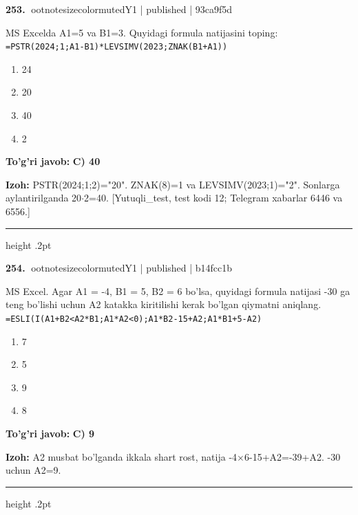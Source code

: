 \documentclass[10pt,a4paper]{article}
\begin{document}
\textbf{\color{ink}253.} {ootnotesizecolor{muted}Y1 | published | 93ca9f5d}
\par
MS Excelda A1=5 va B1=3. Quyidagi formula natijasini toping: \newline  \newline \texttt{=PSTR(2024;1;A1-B1)*LEVSIMV(2023;ZNAK(B1+A1))}
\begin{enumerate}[label=\Alph*),leftmargin=9mm]
\item 24
\item 20
\item 40
\item 2
\end{enumerate}
\begin{tcolorbox}[enhanced,breakable,colback=teal!4,colframe=teal!55!black,boxrule=0.45pt,arc=1.2mm,left=2.8mm,right=2.8mm,top=2mm,bottom=2mm]
\textbf{\color{teal}To'g'ri javob:} \textbf{C) 40}
\par\smallskip
\textbf{Izoh:} PSTR(2024;1;2)="20". ZNAK(8)=1 va LEVSIMV(2023;1)="2". Sonlarga aylantirilganda 20\ensuremath{\cdot}2=40. [Yutuqli\_test, test kodi 12; Telegram xabarlar 6446 va 6556.]
\end{tcolorbox}
\vspace{2mm}\hrule height .2pt\vspace{2mm}

\textbf{\color{ink}254.} {ootnotesizecolor{muted}Y1 | published | b14fcc1b}
\par
MS Excel. Agar A1 = -4, B1 = 5, B2 = 6 bo'lsa, quyidagi formula natijasi -30 ga teng bo'lishi uchun A2 katakka kiritilishi kerak bo'lgan qiymatni aniqlang. \newline  \newline \texttt{=ESLI(I(A1+B2\textless{}A2*B1;A1*A2\textless{}0);A1*B2-15+A2;A1*B1+5-A2)}
\begin{enumerate}[label=\Alph*),leftmargin=9mm]
\item 7
\item 5
\item 9
\item 8
\end{enumerate}
\begin{tcolorbox}[enhanced,breakable,colback=teal!4,colframe=teal!55!black,boxrule=0.45pt,arc=1.2mm,left=2.8mm,right=2.8mm,top=2mm,bottom=2mm]
\textbf{\color{teal}To'g'ri javob:} \textbf{C) 9}
\par\smallskip
\textbf{Izoh:} A2 musbat bo'lganda ikkala shart rost, natija -4\ensuremath{\times}6-15+A2=-39+A2. -30 uchun A2=9.
\end{tcolorbox}
\vspace{2mm}\hrule height .2pt\vspace{2mm}
\end{document}
